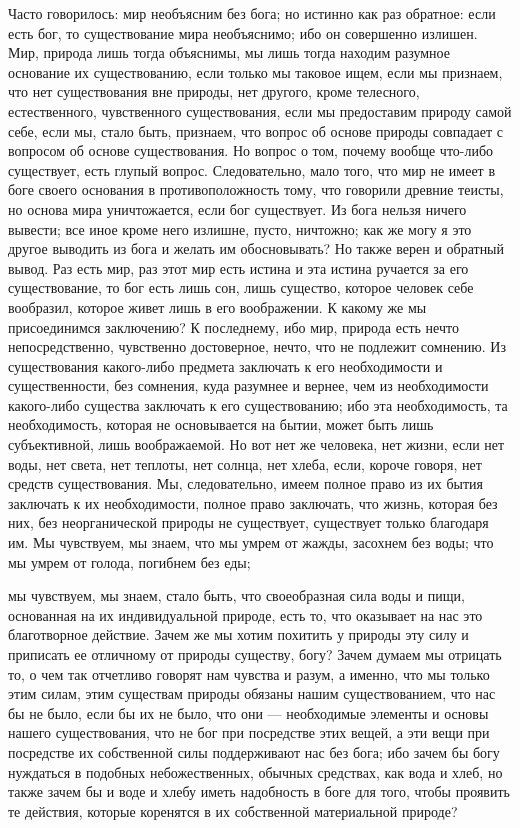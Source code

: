 \documentclass[12pt]{article}
\begin{document}
Часто говорилось: мир необъясним без бога; но истинно как раз обратное: если есть бог, то существование мира необъяснимо; ибо он совершенно излишен. Мир, природа лишь тогда объяснимы, мы лишь тогда находим разумное основание их существованию, если только мы таковое ищем, если мы признаем, что нет существования вне природы, нет другого, кроме телесного, естественного, чувственного существования, если мы предоставим природу самой себе, если мы, стало быть, признаем, что вопрос об основе природы совпадает с вопросом об основе существования. Но вопрос о том, почему вообще что-либо существует, есть глупый вопрос. Следовательно, мало того, что мир не имеет в боге своего основания в противоположность тому, что говорили древние теисты, но основа мира уничтожается, если бог существует. Из бога нельзя ничего вывести; все иное кроме него излишне, пусто, ничтожно; как же могу я это другое выводить из бога и желать им обосновывать? Но также верен и обратный вывод. Раз есть мир, раз этот мир есть истина и эта истина ручается за его существование, то бог есть лишь сон, лишь существо, которое человек себе вообразил, которое живет лишь в его воображении. К какому же мы присоединимся заключению? К последнему, ибо мир, природа есть нечто непосредственно, чувственно достоверное, нечто, что не подлежит сомнению. Из существования какого-либо предмета заключать к его необходимости и существенности, без сомнения, куда разумнее и вернее, чем из необходимости какого-либо существа заключать к его существованию; ибо эта необходимость, та необходимость, которая не основывается на бытии, может быть лишь субъективной, лишь воображаемой. Но вот нет же человека, нет жизни, если нет воды, нет света, нет теплоты, нет солнца, нет хлеба, если, короче говоря, нет средств существования. Мы, следовательно, имеем полное право из их бытия заключать к их необходимости, полное право заключать, что жизнь, которая без них, без неорганической природы не существует, существует только благодаря им. Мы чувствуем, мы знаем, что мы умрем от жажды, засохнем без воды; что мы умрем от голода, погибнем без еды; 

мы чувствуем, мы знаем, стало быть, что своеобразная сила воды и пищи, основанная на их индивидуальной природе, есть то, что оказывает на нас это благотворное действие. Зачем же мы хотим похитить у природы эту силу и приписать ее отличному от природы существу, богу? Зачем думаем мы отрицать то, о чем так отчетливо говорят нам чувства и разум, а именно, что мы только этим силам, этим существам природы обязаны нашим существованием, что нас бы не было, если бы их не было, что они --- необходимые элементы и основы нашего существования, что не бог при посредстве этих вещей, а эти вещи при посредстве их собственной силы поддерживают нас без бога; ибо зачем бы богу нуждаться в подобных небожественных, обычных средствах, как вода и хлеб, но также зачем бы и воде и хлебу иметь надобность в боге для того, чтобы проявить те действия, которые коренятся в их собственной материальной природе? 
\end{document}
